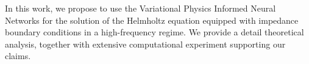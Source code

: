 In this work, we propose to use the Variational Physics Informed
Neural Networks for the solution of the Helmholtz equation equipped
with impedance boundary conditions in a high-frequency regime.
We provide a detail theoretical analysis, together with extensive
computational experiment supporting our claims.